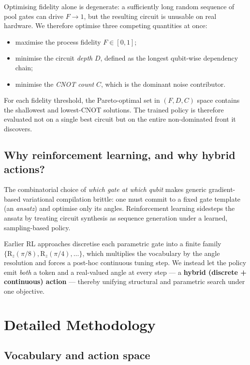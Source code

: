 \documentclass[11pt,a4paper]{article}
\begin{document}
Optimising fidelity alone is degenerate: a sufficiently long random sequence of pool gates can drive $F \to 1$, but the resulting circuit is unusable on real hardware. We therefore optimise three competing quantities at once:
\begin{itemize}[leftmargin=2em]
  \item maximise the process fidelity $F \in [0, 1]$;
  \item minimise the circuit \emph{depth} $D$, defined as the longest qubit-wise dependency chain;
  \item minimise the \emph{CNOT count} $C$, which is the dominant noise contributor.
\end{itemize}
For each fidelity threshold, the Pareto-optimal set in $(F, D, C)$ space contains the shallowest and lowest-CNOT solutions. The trained policy is therefore evaluated not on a single best circuit but on the entire non-dominated front it discovers.

\subsection{Why reinforcement learning, and why hybrid actions?}

The combinatorial choice of \emph{which gate at which qubit} makes generic gradient-based variational compilation brittle: one must commit to a fixed gate template (an \emph{ansatz}) and optimise only its angles. Reinforcement learning sidesteps the ansatz by treating circuit synthesis as sequence generation under a learned, sampling-based policy.

Earlier RL approaches discretise each parametric gate into a finite family $\{\mathrm{R}_z(\pi/8), \mathrm{R}_z(\pi/4), \dots\}$, which multiplies the vocabulary by the angle resolution and forces a post-hoc continuous tuning step. We instead let the policy emit \emph{both} a token and a real-valued angle at every step --- a \textbf{hybrid (discrete + continuous) action} --- thereby unifying structural and parametric search under one objective.

\section{Detailed Methodology}

\subsection{Vocabulary and action space}
\label{sec:vocab}
\end{document}
